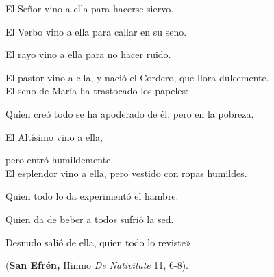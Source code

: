 


\begin{ccebody}
	
	
		
\end{ccebody}





\begin{ccebody}
	
\end{ccebody}




\begin{ccebody}
	
	
	
	
	
	
	
	
	
	
		
\end{ccebody}

\begin{patercite}
	El Señor vino a ella para hacerse siervo.
	
	El Verbo vino a ella para callar en su seno.
	
	El rayo vino a ella para no hacer ruido.
	
	El pastor vino a ella, y nació el Cordero, que llora dulcemente. \\
	
	
	El seno de María ha trastocado los papeles:
	
	Quien creó todo se ha apoderado de él, pero en la pobreza.
	
	El Altísimo vino a ella,
	
	pero entró humildemente. \\
	
	
	El esplendor vino a ella, pero vestido con ropas humildes.
	
	Quien todo lo da experimentó el hambre.
	
	Quien da de beber a todos sufrió la sed.
	
	Desnudo salió de ella, quien todo lo reviste»
	
	(\textbf{San Efrén,} Himno \emph{De Nativitate} 11, 6-8).				
\end{patercite}	